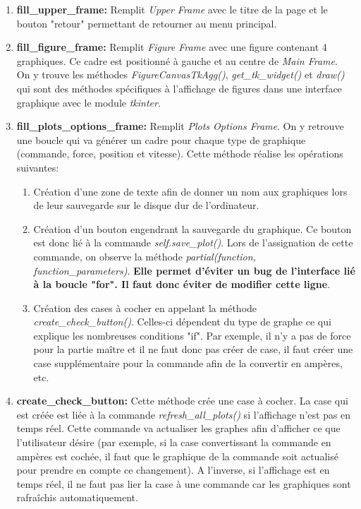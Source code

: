 \begin{enumerate}
    
    \item \textbf{fill\_upper\_frame:} Remplit \textit{Upper Frame} avec le titre de la page et le bouton "retour" permettant de retourner au menu principal.
    
    \item \textbf{fill\_figure\_frame:} Remplit \textit{Figure Frame} avec une figure contenant 4 graphiques. Ce cadre est positionné à gauche et au centre de \textit{Main Frame}.\\
    On y trouve les méthodes \textit{FigureCanvasTkAgg()}, \textit{get\_tk\_widget()} et \textit{draw()} qui sont des méthodes spécifiques à l'affichage de figures dans une interface graphique avec le module \textit{tkinter}.
    
    \item \textbf{fill\_plots\_options\_frame:} Remplit \textit{Plots Options Frame}. On y retrouve une boucle qui va générer un cadre pour chaque type de graphique (commande, force, position et vitesse). Cette méthode réalise les opérations suivantes:
    \begin{enumerate}
        \item Création d'une zone de texte afin de donner un nom aux graphiques lors de leur sauvegarde sur le disque dur de l'ordinateur.
        \item Création d'un bouton engendrant la sauvegarde du graphique. Ce bouton est donc lié à la commande \textit{self.save\_plot()}. Lors de l'assignation de cette commande, on observe la méthode \textit{partial(function, function\_parameters)}. \textbf{Elle permet d'éviter un bug de l'interface lié à la boucle "for". Il faut donc éviter de modifier cette ligne}.
        \item Création des cases à cocher en appelant la méthode \textit{create\_check\_button()}. Celles-ci dépendent du type de graphe ce qui explique les nombreuses conditions "if". Par exemple, il n'y a pas de force pour la partie maître et il ne faut donc pas créer de case, il faut créer une case supplémentaire pour la commande afin de la convertir en ampères, etc.
    \end{enumerate}
    
    \item \textbf{create\_check\_button:} Cette méthode crée une case à cocher. La case qui est créée est liée à la commande \textit{refresh\_all\_plots()} si l'affichage n'est pas en temps réel. Cette commande va actualiser les graphes afin d'afficher ce que l'utilisateur désire (par exemple, si la case convertissant la commande en ampères est cochée, il faut que le graphique de la commande soit actualisé pour prendre en compte ce changement). A l'inverse, si l'affichage est en temps réel, il ne faut pas lier la case à une commande car les graphiques sont rafraîchis automatiquement.
    

\end{enumerate}

